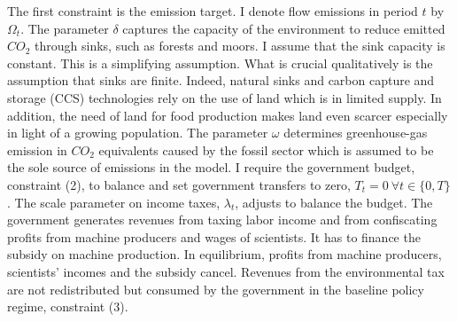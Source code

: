 The first constraint is the emission target. I denote flow emissions in period $t$ by $\Omega_t$.  The parameter $\delta$ captures the capacity of the environment to reduce emitted $CO_2$ through sinks, such as forests and moors.  I assume that the sink capacity is constant.  This is a simplifying assumption. What is crucial qualitatively is the assumption that sinks are finite. Indeed, natural sinks and carbon capture and storage (CCS) technologies rely on the use of land \citep{VanVuuren2018AlternativeTechnologies} which is in limited supply. In addition, the need of land for food production makes land even scarcer especially in light of a growing population. The parameter $\omega$ determines greenhouse-gas emission in $CO_2$ equivalents caused by the fossil sector which is assumed to be the sole source of emissions in the model. %
I require the government budget, constraint (2), to balance and set government transfers to zero, $T_t=0\ \forall t\in\{0,T\}$. The scale parameter on income taxes, $\lambda_t$, adjusts to balance the budget.
The government generates revenues from taxing labor income and from confiscating profits from machine producers and wages of scientists. It has to finance the subsidy on machine production. In equilibrium, profits from machine producers, scientists' incomes and the subsidy cancel. 
Revenues from the environmental tax are not redistributed but consumed by the government in the baseline policy regime, constraint (3).

